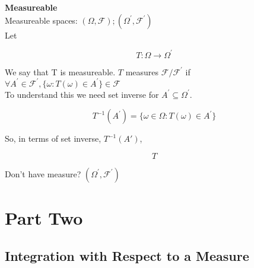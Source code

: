\documentclass[11pt,fleqn]{book} %
\begin{document}
\textbf{Measureable}\\


Measureable spaces: $(\Omega, \mathcal{F}); (\Omega^\prime, \mathcal{F}^\prime)$\\

Let

		$$T : \Omega \rightarrow \Omega^\prime $$

We say that T is measureable. $T$ measures $\mathcal{F}/\mathcal{F}^\prime$ if $\forall A^\prime \in \mathcal{F}^\prime, \{\omega: T(\omega) \in A^\prime\} \in \mathcal{F}$\\

To understand this we need set inverse for $A^\prime \subseteq \Omega^\prime$. 

		$$T^{-1}( A^\prime) = \{ \omega \in \Omega: T(\omega) \in A^\prime\} $$ 

So, in terms of set inverse, $T^{-1}(A\prime)$, 

		$$T  $$




Don't have measure? $(\Omega^\prime, \mathcal{F}^\prime)$




 \part{Part Two}




\chapter{Integration with Respect to a Measure}





\end{document}
